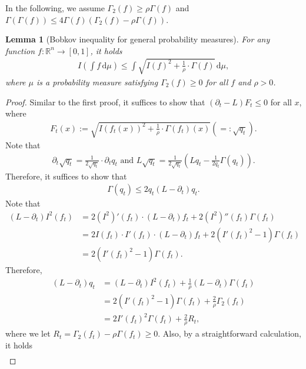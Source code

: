 \documentclass[11pt]{article}
\theoremstyle{plain}
\newtheorem{lemma}[theorem]{Lemma}
\theoremstyle{definition}
\theoremstyle{remark}
\newcommand{\dif}{\,\mathrm{d}}
\newcommand{\tuple}[1]{\left(#1\right)}
\newcommand{\tp}{\tuple}
\begin{document}
In the following, we assume $\Gamma_2(f) \ge \rho \Gamma(f)$ and $\Gamma(\Gamma(f)) \le 4 \Gamma(f) \tp{\Gamma_2(f) - \rho \Gamma(f)}$.
\begin{lemma}[Bobkov inequality for general probability measures]
    For any function $f: \mathbb{R}^n \to [0,1]$, it holds
    \begin{align*}
        I\tp{\int f \dif \mu} \le \int \sqrt{I(f)^2 + \frac{1}{\rho} \cdot \Gamma(f)} \dif \mu,
    \end{align*}
    where $\mu$ is a probability measure satisfying $\Gamma_2(f) \ge 0$ for all $f$ and $\rho > 0$.
\end{lemma}
\begin{proof}
    Similar to the first proof, it suffices to show that $(\partial_t - L) F_t \le 0$ for all $x$, where
    \begin{align*}
        F_t(x) := \sqrt{I(f_t(x))^2 + \frac{1}{\rho} \cdot \Gamma(f_t)(x)} (=: \sqrt{q_t}).
    \end{align*}
    Note that
    \begin{align*}
        \partial_t \sqrt{q_t} = \frac{1}{2 \sqrt{q_t}} \cdot \partial_t q_t \text{ and } L \sqrt{q_t} = \frac{1}{2\sqrt{q_t}}\tp{L q_t - \frac{1}{2q_t} \Gamma(q_t)}.
    \end{align*}
    Therefore, it suffices to show that
    \begin{align*}
        \Gamma(q_t) \le 2 q_t (L - \partial_t) q_t.
    \end{align*}
    Note that
    \begin{align*}
        (L - \partial_t) I^2(f_t) &= 2 (I^2)'(f_t) \cdot (L - \partial_t) f_t + 2 (I^2)''(f_t) \Gamma(f_t)\\
        &= 2 I(f_t) \cdot I'(f_t) \cdot (L - \partial_t) f_t + 2 (I'(f_t)^2 -1) \Gamma(f_t)\\
        &= 2(I'(f_t)^2 -1) \Gamma(f_t).
    \end{align*}
    Therefore,
    \begin{align*}
        (L - \partial_t) q_t &= (L - \partial_t) I^2(f_t) + \frac{1}{\rho} (L - \partial_t) \Gamma(f_t)\\
        &= 2(I'(f_t)^2 -1) \Gamma(f_t) + \frac{2}{\rho} \Gamma_2(f_t)\\
        &= 2I'(f_t)^2 \Gamma(f_t) + \frac{2}{\rho} R_t,
    \end{align*}
    where we let $R_t = \Gamma_2(f_t) - \rho \Gamma(f_t) \ge 0$.
    Also, by a straightforward calculation, it holds
    \begin{align*}

\end{align*}
\end{proof}
\end{document}
